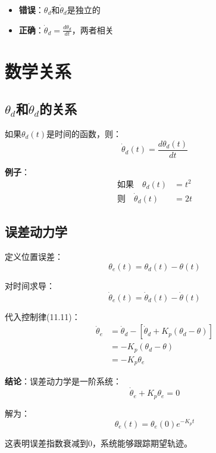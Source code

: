 \documentclass[12pt,a4paper]{article}
\begin{document}
\begin{itemize}
\item \textbf{错误}：$\theta_d$和$\dot{\theta}_d$是独立的
\item \textbf{正确}：$\dot{\theta}_d = \frac{d\theta_d}{dt}$，两者相关
\end{itemize}

\section{数学关系}

\subsection{$\theta_d$和$\dot{\theta}_d$的关系}

如果$\theta_d(t)$是时间的函数，则：
\begin{equation}
\dot{\theta}_d(t) = \frac{d\theta_d(t)}{dt}
\end{equation}

\textbf{例子}：
\begin{align}
\text{如果} \quad \theta_d(t) &= t^2 \\
\text{则} \quad \dot{\theta}_d(t) &= 2t
\end{align}

\subsection{误差动力学}

定义位置误差：
\begin{equation}
\theta_e(t) = \theta_d(t) - \theta(t)
\end{equation}

对时间求导：
\begin{equation}
\dot{\theta}_e(t) = \dot{\theta}_d(t) - \dot{\theta}(t)
\end{equation}

代入控制律(11.11)：
\begin{align}
\dot{\theta}_e &= \dot{\theta}_d - [\dot{\theta}_d + K_p(\theta_d - \theta)] \\
              &= -K_p(\theta_d - \theta) \\
              &= -K_p \theta_e
\end{align}

\textbf{结论}：误差动力学是一阶系统：
\begin{equation}
\dot{\theta}_e + K_p \theta_e = 0
\end{equation}

解为：
\begin{equation}
\theta_e(t) = \theta_e(0) e^{-K_p t}
\end{equation}

这表明误差指数衰减到0，系统能够跟踪期望轨迹。
\end{document}
